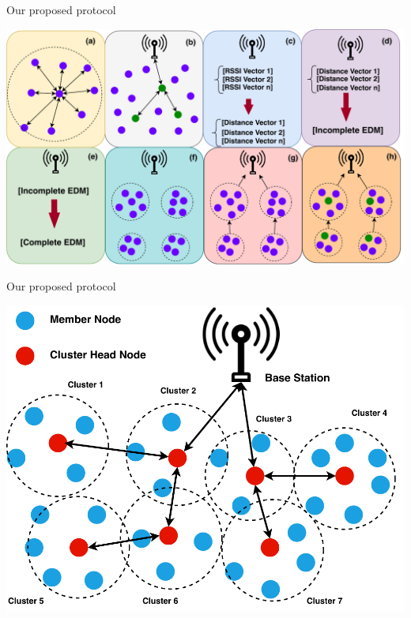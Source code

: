 \documentclass{beamer}
\begin{document}
\begin{frame}[t]{Our proposed protocol} %
\begin{center}
\includegraphics[scale=0.51]{figure/Steps.pdf}
\end{center}
\end{frame}

\begin{frame}[t]{Our proposed protocol} %
\begin{center}
\includegraphics[scale=0.51]{figure/Output.pdf}
\end{center}
\end{frame}
\end{document}
